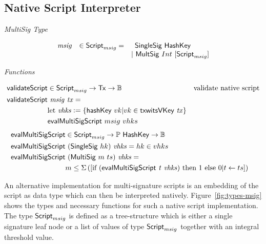 \documentclass[11pt,a4paper,dvipsnames]{article}
\newcommand{\Bool}{\ensuremath{\mathbb{B}}}
\newcommand{\Tx}{\type{Tx}}
\newcommand{\Script}{\type{Script}}
\newcommand{\ScriptMSig}{\Script_{msig}}
\newcommand{\HashKey}{\type{HashKey}}
\theoremstyle{definition}
\newcommand{\leteq}{\ensuremath{\mathrel{\mathop:}=}}
\begin{document}
\subsection{Native Script Interpreter}
\label{sec:native-script-interp}

\begin{figure*}[hbt]
  \emph{MultiSig Type}

  \begin{equation*}
    \begin{array}{rll}
      \var{msig} & \in \ScriptMSig = & \,\,\,\type{SingleSig}~\HashKey \\
       && \vert\,\,\type{MultSig}~Int~[\ScriptMSig]
    \end{array}
  \end{equation*}

  \emph{Functions}

  \begin{align*}
    \fun{validateScript} & \in\ScriptMSig\to\Tx\to\Bool & \text{validate native
                                                          script} \\
    \fun{validateScript} & ~\var{msig}~\var{tx}= \\
                         & \textrm{let}~\var{vhks}\leteq \{\fun{hashKey}~vk \vert
                           vk \in \fun{txwitsVKey}~\var{tx}\} \\
                         & \fun{evalMultiSigScript}~msig~vhks\\
  \end{align*}
  \begin{align*}
    \fun{evalMultiSigScript} & \in\ScriptMSig\to\powerset\HashKey\to\Bool & \\
    \fun{evalMultiSigScript} & ~(\type{SingleSig}~hk)~\var{vhks} =  hk \in vhks \\
    \fun{evalMultiSigScript} & ~(\type{MultiSig}~m~ts)~\var{vhks} = \\
                             & m \leq \Sigma
                               \left(
                               [\textrm{if}~(\fun{evalMultiSigScript}~\var{t}~\var{vhks})~
                               \textrm{then}~1~\textrm{else}~0\vert t \leftarrow ts]
                               \right)
  \end{align*}

  \caption{Implementation based on Native Scripts}
  \label{fig:types-msig}
\end{figure*}

An alternative implementation for multi-signature scripts is an embedding of the
script as data type which can then be interpreted
natively. Figure~\ref{fig:types-msig} shows the types and necessary functions
for such a native script implementation. The type $\ScriptMSig$ is defined as a
tree-structure which is either a single signature leaf node or a list of
values of type $\ScriptMSig$ together with an integral threshold value.
\end{document}
